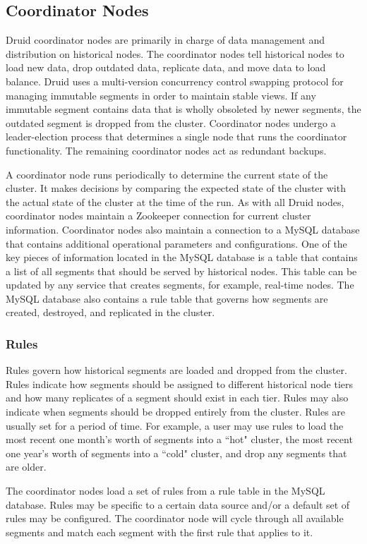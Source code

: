 \documentclass{sig-alternate-2013}
\begin{document}
\subsection{Coordinator Nodes}
Druid coordinator nodes are primarily in charge of data management and
distribution on historical nodes. The coordinator nodes tell historical nodes
to load new data, drop outdated data, replicate data, and move data to load
balance. Druid uses a multi-version concurrency control swapping protocol for
managing immutable segments in order to maintain stable views.  If any
immutable segment contains data that is wholly obsoleted by newer segments, the
outdated segment is dropped from the cluster. Coordinator nodes undergo a
leader-election process that determines a single node that runs the coordinator
functionality. The remaining coordinator nodes act as redundant backups.

A coordinator node runs periodically to determine the current state of the
cluster. It makes decisions by comparing the expected state of the cluster with
the actual state of the cluster at the time of the run. As with all Druid
nodes, coordinator nodes maintain a Zookeeper connection for current cluster
information. Coordinator nodes also maintain a connection to a MySQL
database that contains additional operational parameters and configurations.
One of the key pieces of information located in the MySQL database is a table
that contains a list of all segments that should be served by historical nodes.
This table can be updated by any service that creates segments, for example,
real-time nodes. The MySQL database also contains a rule table that governs how
segments are created, destroyed, and replicated in the cluster.

\subsubsection{Rules}
Rules govern how historical segments are loaded and dropped from the cluster.
Rules indicate how segments should be assigned to different historical node
tiers and how many replicates of a segment should exist in each tier. Rules may
also indicate when segments should be dropped entirely from the cluster. Rules
are usually set for a period of time.  For example, a user may use rules to
load the most recent one month's worth of segments into a ``hot" cluster, the
most recent one year's worth of segments into a ``cold" cluster, and drop any
segments that are older.

The coordinator nodes load a set of rules from a rule table in the MySQL
database. Rules may be specific to a certain data source and/or a default set
of rules may be configured. The coordinator node will cycle through all available
segments and match each segment with the first rule that applies to it.
\end{document}
